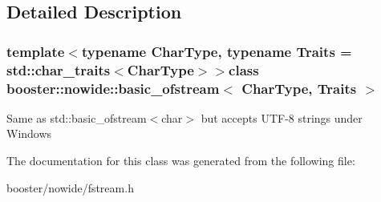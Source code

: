 \subsection{\-Detailed \-Description}
\subsubsection*{template$<$typename Char\-Type, typename Traits = std\-::char\-\_\-traits$<$\-Char\-Type$>$$>$class booster\-::nowide\-::basic\-\_\-ofstream$<$ Char\-Type, Traits $>$}

\-Same as std\-::basic\-\_\-ofstream$<$char$>$ but accepts \-U\-T\-F-\/8 strings under \-Windows 

\-The documentation for this class was generated from the following file\-:\begin{DoxyCompactItemize}
\item 
booster/nowide/fstream.\-h\end{DoxyCompactItemize}
